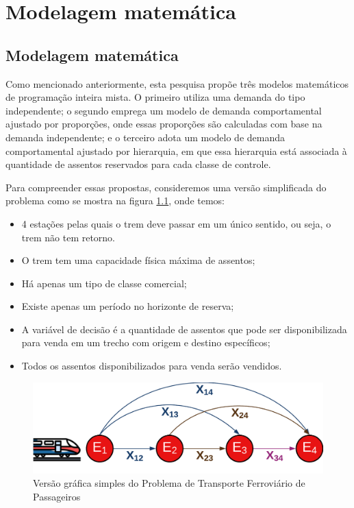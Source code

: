 \chapter{Modelagem matemática }

\section{Modelagem matemática}

Como mencionado anteriormente, esta pesquisa propõe três modelos matemáticos de programação inteira mista. O primeiro utiliza uma demanda do tipo independente; o segundo emprega um modelo de demanda comportamental ajustado por proporções, onde essas proporções são calculadas com base na demanda independente; e o terceiro adota um modelo de demanda comportamental ajustado por hierarquia, em que essa hierarquia está associada à quantidade de assentos reservados para cada classe de controle.

Para compreender essas propostas, consideremos uma versão simplificada do problema como se mostra na figura \ref{fig: fig1}, onde temos:

\begin{itemize}
	\item 4 estações pelas quais o trem deve passar em um único sentido, ou seja, o trem não tem retorno.
	\item O trem tem uma capacidade física máxima de assentos;
	\item Há apenas um tipo de classe comercial;
	\item Existe apenas um período no horizonte de reserva;
	\item A variável de decisão é a quantidade de assentos que pode ser disponibilizada para venda em um trecho com origem e destino específicos;
	\item Todos os assentos disponibilizados para venda serão vendidos.
\end{itemize}

\begin{figure}[th]
	\begin{center}
		\includegraphics[scale=0.18]{img/repre_ini1.png}
		\caption{Versão gráfica simples do Problema de Transporte Ferroviário de Passageiros}
		\label{fig: fig1}
	\end{center}
\end{figure}


